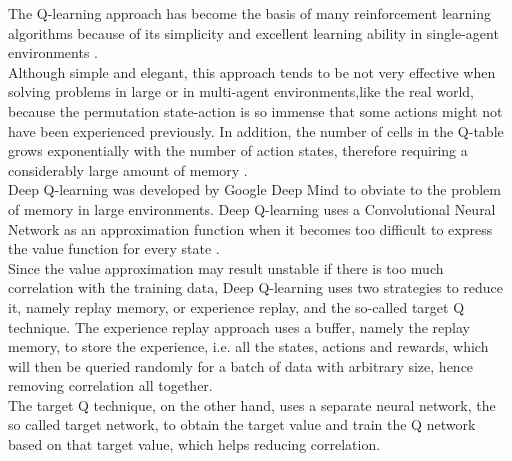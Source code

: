 \documentclass[conference]{IEEEtran}
\begin{document}
The Q-learning approach has become the basis of many reinforcement learning algorithms because of its simplicity and excellent learning ability in single-agent environments \cite{Q_learning}.\\
Although simple and elegant, this approach tends to be not very effective when solving problems in large or in multi-agent environments,like the real world, because the permutation state-action is so immense that some actions might not have been experienced previously. In addition, the number of cells in the Q-table grows exponentially with the number of action states, therefore requiring a considerably large amount of memory \cite{Q_learning}.\\
Deep Q-learning was developed by Google Deep Mind to obviate to the problem of memory in large environments. Deep Q-learning uses a Convolutional Neural Network as an approximation function when it becomes too difficult to express the value function for every state \cite{Q_learning}.\\
Since the value approximation may result unstable if there is too much correlation with the training data, Deep Q-learning uses two strategies to reduce it, namely replay memory, or experience replay, and the so-called target Q technique. 
The experience replay approach uses a buffer, namely the replay memory, to store the experience, i.e. all the states, actions and rewards, which will then be queried randomly for a batch of data with arbitrary size, hence removing correlation all together. \cite{Q_learning}\\
The target Q technique, on the other hand, uses a separate neural network, the so called target network, to obtain the target value and train the Q network based on that target value, which helps reducing correlation\cite{Q_learning}.\\
\end{document}
